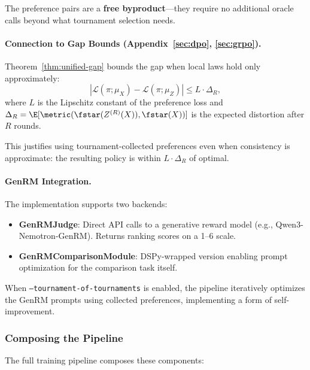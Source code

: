 The preference pairs are a \textbf{free byproduct}---they require no additional oracle calls beyond what tournament selection needs.

\paragraph{Connection to Gap Bounds (Appendix~\ref{sec:dpo}, \ref{sec:grpo}).}
Theorem~\ref{thm:unified-gap} bounds the gap when local laws hold only approximately:
\[
|\mathcal{L}(\pi; \mu_X) - \mathcal{L}(\pi; \mu_Z)| \le L \cdot \Delta_R,
\]
where $L$ is the Lipschitz constant of the preference loss and $\Delta_R = \E[\metric(\fstar(Z^{(R)}(X)), \fstar(X))]$ is the expected distortion after $R$ rounds.

This justifies using tournament-collected preferences even when consistency is approximate: the resulting policy is within $L \cdot \Delta_R$ of optimal.

\paragraph{GenRM Integration.}
The implementation supports two backends:
\begin{itemize}[nosep]
    \item \textbf{GenRMJudge}: Direct API calls to a generative reward model (e.g., Qwen3-Nemotron-GenRM). Returns ranking scores on a 1--6 scale.
    \item \textbf{GenRMComparisonModule}: DSPy-wrapped version enabling prompt optimization for the comparison task itself.
\end{itemize}

When \texttt{--tournament-of-tournaments} is enabled, the pipeline iteratively optimizes the GenRM prompts using collected preferences, implementing a form of self-improvement.

\subsubsection{Composing the Pipeline}

The full training pipeline composes these components:

\begin{center}
\end{center}

